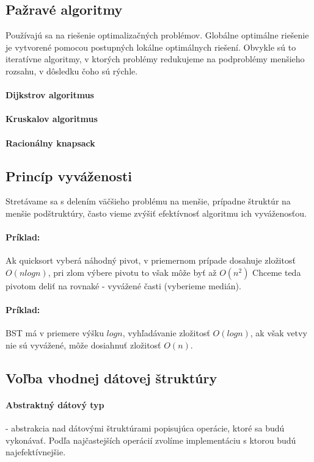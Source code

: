 	\subsection*{Pažravé algoritmy}
		Používajú sa na riešenie optimalizačných problémov. Globálne optimálne riešenie je vytvorené pomocou postupných lokálne optimálnych riešení. Obvykle sú to iteratívne algoritmy, v ktorých problémy redukujeme na podproblémy menšieho rozsahu, v dôsledku čoho sú rýchle.
		\paragraph{Dijkstrov algoritmus}
		\paragraph{Kruskalov algoritmus}
		\paragraph{Racionálny knapsack}
	\subsection*{Princíp vyváženosti}
		Stretávame sa s delením väčšieho problému na menšie, prípadne štruktúr na menšie podštruktúry, často vieme zvýšiť efektívnosť algoritmu ich vyváženosťou.
		\paragraph{Príklad:} Ak quicksort vyberá náhodný pivot, v priemernom prípade dosahuje zložitosť $O(n log n)$, pri zlom výbere pivotu to však môže byť až $O(n^{2})$ Chceme teda pivotom deliť na rovnaké - vyvážené časti (vyberieme medián).\\
		\paragraph{Príklad:} BST má v priemere výšku $log n$, vyhľadávanie zložitosť $O(log n)$, ak však vetvy nie sú vyvážené, môže dosiahnuť zložitosť $O(n)$.
	

	\subsection*{Voľba vhodnej dátovej štruktúry}
		\paragraph{Abstraktný dátový typ} - abstrakcia nad dátovými štruktúrami popisujúca operácie, ktoré sa budú vykonávať. Podľa najčastejších operácií zvolíme implementáciu s ktorou budú najefektívnejšie.\\
		
